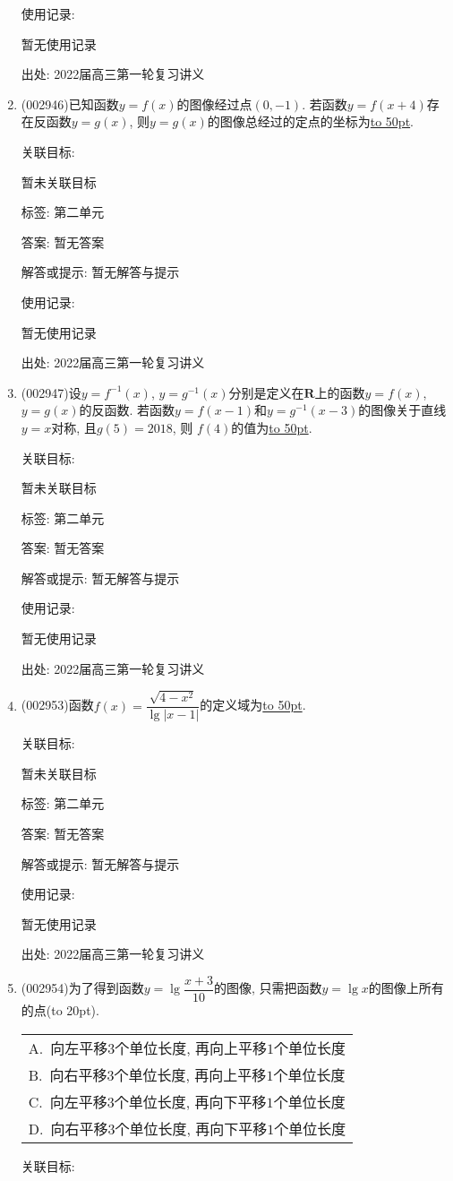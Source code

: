 \documentclass[10pt,a4paper]{article}
\newcommand{\blank}[1]{\underline{\hbox to #1pt{}}}
\newcommand{\bracket}[1]{(\hbox to #1pt{})}
\newcommand{\onech}[4]{\par\begin{tabular}{p{.9\textwidth}}
A.~#1\\
B.~#2\\
C.~#3\\
D.~#4
\end{tabular}}
\begin{document}
\begin{enumerate}[1.]
使用记录:

暂无使用记录


出处: 2022届高三第一轮复习讲义
\item { (002946)}已知函数$y=f(x)$的图像经过点$(0,-1)$. 若函数$y=f(x+4)$存在反函数$y=g(x)$, 则$y=g(x)$的图像总经过的定点的坐标为\blank{50}.


关联目标:

暂未关联目标



标签: 第二单元

答案: 暂无答案

解答或提示: 暂无解答与提示

使用记录:

暂无使用记录


出处: 2022届高三第一轮复习讲义
\item { (002947)}设$y=f^{-1}(x)$, $y=g^{-1}(x)$分别是定义在$\mathbf{R}$上的函数$y=f(x)$, $y=g(x)$的反函数. 若函数$y=f(x-1)$和$y=g^{-1}(x-3)$的图像关于直线$y=x$对称, 且$g(5)=2018$, 则 $f(4)$的值为\blank{50}.


关联目标:

暂未关联目标



标签: 第二单元

答案: 暂无答案

解答或提示: 暂无解答与提示

使用记录:

暂无使用记录


出处: 2022届高三第一轮复习讲义
\item { (002953)}函数$f(x)=\dfrac{\sqrt{4-x^2}}{\lg |x-1|}$的定义域为\blank{50}.


关联目标:

暂未关联目标



标签: 第二单元

答案: 暂无答案

解答或提示: 暂无解答与提示

使用记录:

暂无使用记录


出处: 2022届高三第一轮复习讲义
\item { (002954)}为了得到函数$y=\lg\dfrac{x+3}{10}$的图像, 只需把函数$y=\lg x$的图像上所有的点\bracket{20}.
\onech{向左平移$3$个单位长度, 再向上平移$1$个单位长度}{向右平移$3$个单位长度, 再向上平移$1$个单位长度}{向左平移$3$个单位长度, 再向下平移$1$个单位长度}{向右平移$3$个单位长度, 再向下平移$1$个单位长度}


关联目标:


\end{enumerate}
\end{document}
